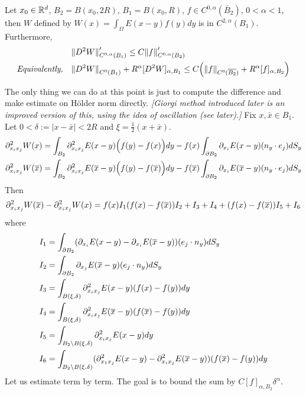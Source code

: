 \documentclass[12pt,a4paper]{article}
\newenvironment{proof}
{\begin{changemargin}{0.5cm}{0.5cm} 
	}%
	{\end{changemargin}
}
\newenvironment{p}
{\begin{proof} 
	}%
	{\end{proof}
}
\begin{document}
 Let $x_0\in \mathbb{R}^d$, $B_2 = B(x_0, 2R)$, $B_1=B(x_0, R)$, $f\in C^{0, \alpha}(\bar{B}_2)$, $0<\alpha<1$, then $W$ defined by $W(x) = \int_{\Omega} E(x-y) f(y)dy$ is in $C^{2,\alpha}(B_1)$. Furthermore,
\begin{align*}
&\snorms{D^2 W}{C^{0, \alpha}(B_1)}' \leq C \snorms{f}{C^{0, \alpha}(B_2)}' \\
\textit{Equivalently,} \quad &\snorms{D^2 W}{C^0(B_1)} +R^{\alpha}[D^2 W]_{\alpha, B_1} \leq C \Big( \snorms{f}{C^0(\bar{B_2})} + R^{\alpha}[f]_{\alpha, B_2} \Big)
\end{align*}
\begin{p}
\pf The only thing we can do at this point is just to compute the difference and make estimate on H\"older norm directly. \emph{[Giorgi method introduced later is an improved version of this, using the idea of oscillation (see later).]}
Fix $x, \bar{x} \in B_1$. Let $0<\delta := |x-\bar{x}|< 2R$ and $\xi = \frac{1}{2}(x+\bar{x})$.
\begin{align*}
&\partial^2_{x_i x_j} W(x) = \int_{B_2} \partial_{x_i x_j}^2 E(x-y) \Big(f(y)- f(x)\Big) dy - f(x) \int_{\partial B_2} \partial_{x_i} E(x-y) (n_y \cdot e_j) dS_y \\
&\partial_{x_i x_j}^2 W(\overline{x}) = \int_{B_2} \partial_{x_i x_j}^2 E(\overline{x}-y) \Big(f(y)- f(\overline{x})\Big) dy - f(\overline{x}) \int_{\partial B_2} \partial_{x_i} E(\overline{x}-y) (n_y \cdot e_j) dS_y
\end{align*}
Then
\begin{align*}
\partial_{x_i x_j}^2 W(\overline{x}) - \partial_{x_i x_j}^2 W(x) = f(x)I_1 (f(x)- f(\overline{x}))I_2 + I_3 + I_4 + (f(x)-f(\overline{x}))I_5 + I_6 
\end{align*}
where
\begin{align*}
&I_1 = \int_{\partial B_2} (\partial_{x_i} E(x-y) - \partial_{x_i}E(\overline{x}-y))(e_j \cdot n_y) dS_y \\
&I_2 = \int_{\partial B_2} \partial_{x_j} E(\overline{x} -y) (e_j \cdot n_y) dS_y \\
&I_3 = \int_{B(\xi, \delta)} \partial^2_{x_i x_j} E(x-y) (f(x)-f(y)) dy \\
&I_4 = \int_{B(\xi, \delta)} \partial_{x_i x_j}^2 E(\overline{x}-y) (f(\overline{x}) - f(y))dy \\
&I_5 = \int_{B_2 \backslash B(\xi, \delta)} \partial_{x_i x_j}^2 E(x-y) dy \\
&I_6 = \int_{B_2 \backslash B(\xi, \delta)} (\partial_{x_1 x_j}^2 E(x-y) - \partial^2_{x_i x_j}E(\overline{x}-y) ) (f(\overline{x}) - f(y))dy
\end{align*}
Let us estimate term by term. The goal is to bound the sum by $C [f]_{\alpha, B_2}\delta^{\alpha}$.

\end{p}
\end{document}

